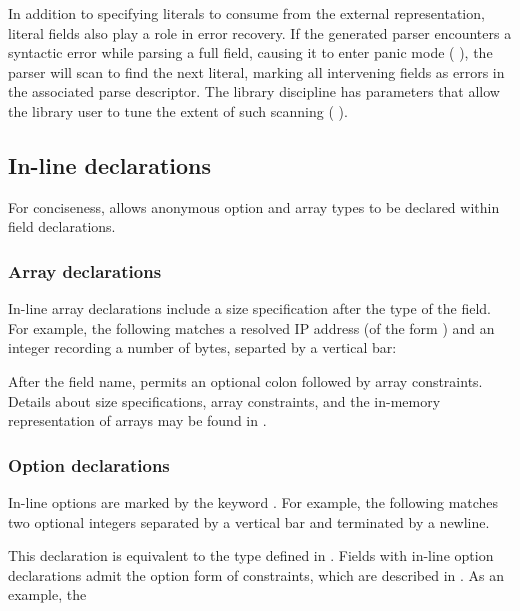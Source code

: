 In addition to specifying literals to consume from the external
representation, literal fields also play a role in error recovery.  If
the generated parser encounters a syntactic error while parsing a full
field, causing it to enter panic mode (\cf{}
), the parser will scan to find the next
literal, marking all intervening fields as errors in the
associated parse descriptor.  The library discipline has parameters
that allow the library user to tune the extent of such scanning
(\cf{} ).

\subsection{In-line declarations}
\label{sec:structs-inline}
For conciseness, \pads{} allows anonymous option and array types to be
declared within \Pstruct{} field declarations. 

\subsubsection{Array declarations}
\label{sec:structs-arrays-inline}
In-line array declarations include a size specification after the type
of the field. For example, the following \Pstruct{} matches a resolved
IP address (of the form ) and an integer recording a
number of bytes, separted by a vertical bar:

%
\noindent
After the field name, \pads{} permits an optional colon followed by
array constraints.  Details about size specifications, array
constraints, and the in-memory representation of arrays may be found
in . 

\subsubsection{Option declarations}
\label{sec:structs-options-inline}
In-line options are marked by the keyword \Popt{}.  For example, the
following \Pstruct{} matches two optional integers separated by a
vertical bar and terminated by a newline.

%
\noindent
This declaration is equivalent to the  type defined in
.
Fields with in-line option declarations admit the option form of
constraints, which are described in .
As an example, the \Pstruct{}  

